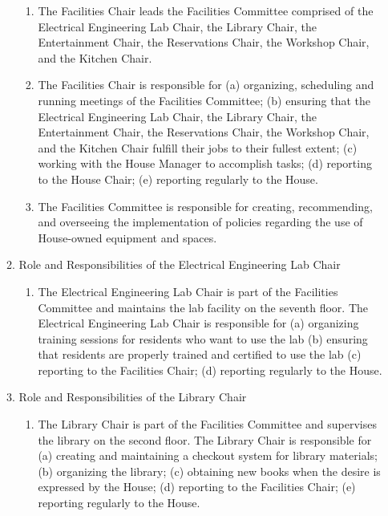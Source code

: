\documentclass[letterpaper]{article}
\begin{document}
\begin{enumerate}
\begin{enumerate}
\begin{enumerate}
\item The Facilities Chair leads the Facilities Committee comprised of the Electrical Engineering Lab Chair, the Library Chair, the Entertainment Chair, the Reservations Chair, the Workshop Chair, and the Kitchen Chair.

\item The Facilities Chair is responsible for (a) organizing, scheduling and running meetings of the Facilities Committee; (b) ensuring that the Electrical Engineering Lab Chair, the Library Chair, the Entertainment Chair, the Reservations Chair, the Workshop Chair, and the Kitchen Chair fulfill their jobs to their fullest extent; (c) working with the House Manager to accomplish tasks; (d) reporting to the House Chair; (e) reporting regularly to the House.

\item The Facilities Committee is responsible for creating, recommending, and overseeing the implementation of policies regarding the use of House-owned equipment and spaces.

\end{enumerate}

\item Role and Responsibilities of the Electrical Engineering Lab Chair

\begin{enumerate}

\item The Electrical Engineering Lab Chair is part of the Facilities Committee and maintains the lab facility on the seventh floor. The Electrical Engineering Lab Chair is responsible for (a) organizing training sessions for residents who want to use the lab (b) ensuring that residents are properly trained and certified to use the lab (c) reporting to the Facilities Chair; (d) reporting regularly to the House.

\end{enumerate}

\item Role and Responsibilities of the Library Chair

\begin{enumerate}

\item The Library Chair is part of the Facilities Committee and supervises the library on the second floor. The Library Chair is responsible for (a) creating and maintaining a checkout system for library materials; (b) organizing the library; (c) obtaining new books when the desire is expressed by the House; (d) reporting to the Facilities Chair; (e) reporting regularly to the House.


\end{enumerate}
\end{enumerate}
\end{enumerate}
\end{document}
